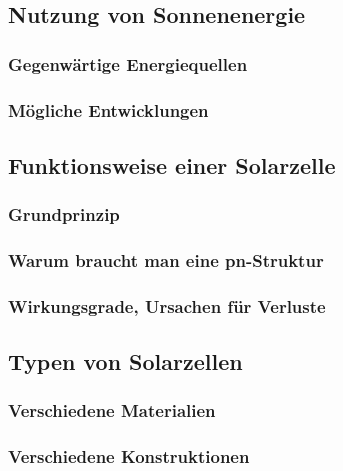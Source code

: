 
\subsection{Nutzung von Sonnenenergie}
	\subsubsection{Gegenwärtige Energiequellen}
	\subsubsection{Mögliche Entwicklungen}

\subsection{Funktionsweise einer Solarzelle}
	\subsubsection{Grundprinzip}
	\subsubsection{Warum braucht man eine pn-Struktur}
	\subsubsection{Wirkungsgrade, Ursachen für Verluste}
\subsection{Typen von Solarzellen}
	\subsubsection{Verschiedene Materialien}
	\subsubsection{Verschiedene Konstruktionen}





